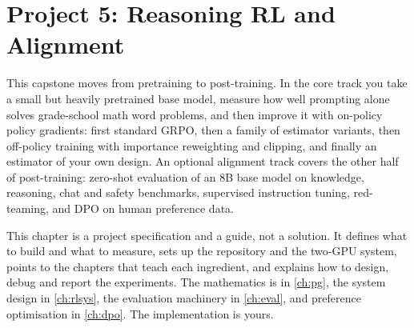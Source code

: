 \chapter{Project 5: Reasoning RL and Alignment}\label{ch:proj5}

This capstone moves from pretraining to post-training. In the core track you take a small but
heavily pretrained base model, measure how well prompting alone solves grade-school math word
problems, and then improve it with on-policy policy gradients: first standard GRPO, then a family
of estimator variants, then off-policy training with importance reweighting and clipping, and
finally an estimator of your own design. An optional alignment track covers the other half of
post-training: zero-shot evaluation of an 8B base model on knowledge, reasoning, chat and safety
benchmarks, supervised instruction tuning, red-teaming, and DPO on human preference data.

This chapter is a project specification and a guide, not a solution. It defines what to build and
what to measure, sets up the repository and the two-GPU system, points to the chapters that teach
each ingredient, and explains how to design, debug and report the experiments. The mathematics is in
\cref{ch:pg}, the system design in \cref{ch:rlsys}, the evaluation machinery in \cref{ch:eval}, and
preference optimisation in \cref{ch:dpo}. The implementation is yours.

